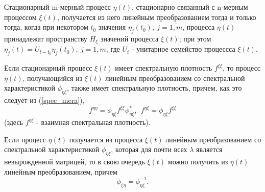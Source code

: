 \begin{remark}\label{hellopuza_remark_1} Стационарный m-мерный процесс $\eta(t)$, стационарно связанный с n-мерным процессом $\xi(t)$, получается из него линейным преобразованием тогда и только тогда, когда при некотором $t_0$ значения $\eta_j(t_0), \ j=\overline{1,m}$, процесса $\eta(t)$ принадлежат пространству $H_\xi$ значений процесса $\xi(t)$; при этом $\eta_j(t) = U_{t-t_0}\eta_j(t_0), \ j=\overline{1,m}$, где $U_t$ - унитарное семейство процессса $\xi(t)$.
\end{remark}

\begin{remark}\label{hellopuza_remark_2} Если стационарный процесс $\xi(t)$ имеет спектральную плотность $f^{\xi\xi}$, то процесс $\eta(t)$, получающийся из $\xi(t)$ линейным преобразованием со спектральной характеристикой $\phi_{\eta\xi}$, также имеет спектральную плотность, причем, как это следует из (\ref{spec_mera}), $$f^{\eta\eta} = \phi_{\eta\xi}f^{\xi\xi}\phi^{*}_{\eta\xi}, \ \ f^{\eta\xi} = \phi_{\eta\xi}f^{\xi\xi}$$ (здесь $f^{\eta\xi}$ - взаимная спектральная плотность).
\end{remark}

\begin{remark}\label{hellopuza_remark_3} Если процесс $\eta(t)$ получается из процесса $\xi(t)$ линейным преобразованием со спектральной характеристикой $\phi_{\eta\xi}$, которая для почти всех $\lambda$ является невырожденной матрицей, то в свою очередь $\xi(t)$ можно получить из $\eta(t)$ линейным преобразованием, причем $$\phi_{\xi\eta} = \phi_{\eta\xi}^{-1}.$$
\end{remark}

